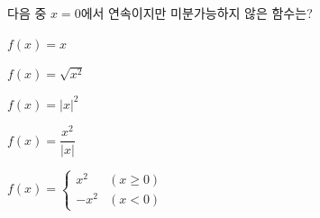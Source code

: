 다음 중 $x=0$에서 연속이지만 미분가능하지 않은 함수는?
\begin{choicesii}{\rule[-3ex]{0pt}{8ex}$f(x)=x$}{\rule[-3ex]{0pt}{8ex}$f(x)=\sqrt{x^2}$}{\rule[-3ex]{0pt}{8ex}$f(x)=|x|^2$}{\rule[-3ex]{0pt}{8ex}$f(x)=\dfrac{x^2}{|x|}$}{\rule[-3ex]{0pt}{8ex}$f(x)=\begin{cases} x^2 & (x\ge 0) \\ -x^2 & (x<0) \end{cases}$}\end{choicesii}
